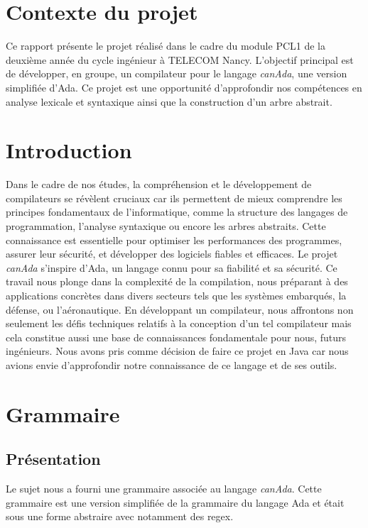 \documentclass[french,a4paper]{article}
\begin{document}
    \section{Contexte du projet}\label{sec:contexte-du-projet}
    Ce rapport présente le projet réalisé dans le cadre du module PCL1 de la deuxième année du cycle ingénieur à TELECOM Nancy.
    L'objectif principal est de développer, en groupe, un compilateur pour le langage \textit{canAda}, une version simplifiée d'Ada.
    Ce projet est une opportunité d'approfondir nos compétences en analyse lexicale et syntaxique ainsi que la construction d'un arbre abstrait.

    \section{Introduction}\label{sec:introduction}
    Dans le cadre de nos études, la compréhension et le développement de compilateurs se révèlent cruciaux car ils permettent de mieux comprendre les principes fondamentaux de l'informatique, comme la structure des langages de programmation, l'analyse syntaxique ou encore les arbres abstraits.
    Cette connaissance est essentielle pour optimiser les performances des programmes, assurer leur sécurité, et développer des logiciels fiables et efficaces.
    Le projet \textit{canAda} s'inspire d'Ada, un langage connu pour sa fiabilité et sa sécurité.
    Ce travail nous plonge dans la complexité de la compilation, nous préparant à des applications concrètes dans divers secteurs tels que les systèmes embarqués, la défense, ou l'aéronautique.
    En développant un compilateur, nous affrontons non seulement les défis techniques relatifs à la conception d'un tel compilateur mais cela constitue aussi une base de connaissances fondamentale pour nous, futurs ingénieurs.
    Nous avons pris comme décision de faire ce projet en Java car nous avions envie d'approfondir notre connaissance de ce langage et de ses outils.

    \section{Grammaire}\label{sec:grammaire}

    \subsection{Présentation}\label{subsec:presentation}
    Le sujet nous a fourni une grammaire associée au langage \textit{canAda}.
    Cette grammaire est une version simplifiée de la grammaire du langage Ada et était sous une forme abstraire avec notamment des regex.
\end{document}
